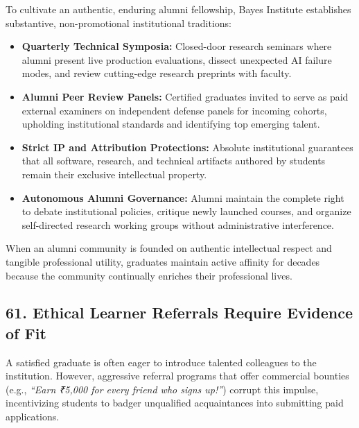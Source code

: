 To cultivate an authentic, enduring alumni fellowship, Bayes Institute establishes substantive, non-promotional institutional traditions:
\begin{itemize}[leftmargin=*]
\item \textbf{Quarterly Technical Symposia:} Closed-door research seminars where alumni present live production evaluations, dissect unexpected AI failure modes, and review cutting-edge research preprints with faculty.
\item \textbf{Alumni Peer Review Panels:} Certified graduates invited to serve as paid external examiners on independent defense panels for incoming cohorts, upholding institutional standards and identifying top emerging talent.
\item \textbf{Strict IP and Attribution Protections:} Absolute institutional guarantees that all software, research, and technical artifacts authored by students remain their exclusive intellectual property.
\item \textbf{Autonomous Alumni Governance:} Alumni maintain the complete right to debate institutional policies, critique newly launched courses, and organize self-directed research working groups without administrative interference.
\end{itemize}

When an alumni community is founded on authentic intellectual respect and tangible professional utility, graduates maintain active affinity for decades because the community continually enriches their professional lives.

\subsection*{61. Ethical Learner Referrals Require Evidence of Fit}

A satisfied graduate is often eager to introduce talented colleagues to the institution. However, aggressive referral programs that offer commercial bounties (e.g., \textit{``Earn ₹5,000 for every friend who signs up!''}) corrupt this impulse, incentivizing students to badger unqualified acquaintances into submitting paid applications.

